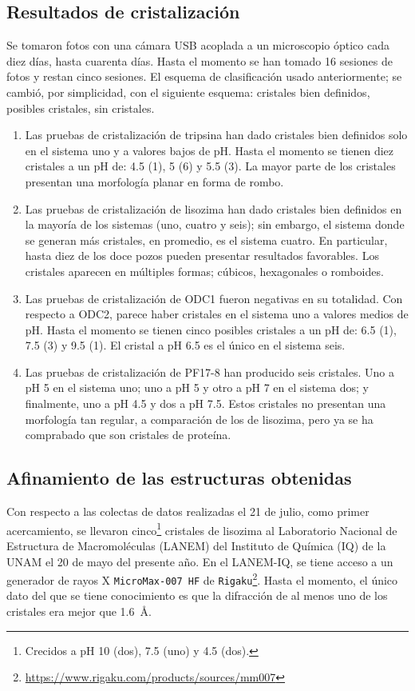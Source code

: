 \documentclass[11pt,letterpaper]{article}
\begin{document}
\subsection{Resultados de cristalización}
Se tomaron fotos con una cámara USB acoplada a un microscopio óptico cada diez días, hasta cuarenta días. Hasta el momento se han tomado 16 sesiones de fotos y restan cinco sesiones. El esquema de clasificación usado anteriormente; se cambió, por simplicidad, con el siguiente esquema: cristales bien definidos, posibles cristales, sin cristales.
\begin{enumerate}
	\item Las pruebas de cristalización de tripsina han dado cristales bien definidos solo en el sistema uno y a valores bajos de pH. Hasta el momento se tienen diez cristales a un pH de: 4.5 (1), 5 (6) y 5.5 (3). La mayor parte de los cristales presentan una morfología planar en forma de rombo.
	\item Las pruebas de cristalización de lisozima han dado cristales bien definidos en la mayoría de los sistemas (uno, cuatro y seis); sin embargo, el sistema donde se generan más cristales, en promedio, es el sistema cuatro. En particular, hasta diez de los doce pozos pueden presentar resultados favorables. Los cristales aparecen en múltiples formas; cúbicos, hexagonales o romboides.  
	\item Las pruebas de cristalización de ODC1 fueron negativas en su totalidad. Con respecto a ODC2, parece haber cristales en el sistema uno a valores medios de pH. Hasta el momento se tienen cinco posibles cristales a un pH de: \num{6.5} (\num{1}), \num{7.5} (\num{3}) y \num{9.5} (\num{1}). El cristal a pH 6.5 es el único en el sistema seis.
	\item Las pruebas de cristalización de PF17-8 han producido seis cristales. Uno a pH \num{5} en el sistema uno; uno a pH \num{5} y otro a pH \num{7} en el sistema dos; y finalmente, uno a pH \num{4.5} y dos a pH \num{7.5}. Estos cristales no presentan una morfología tan regular, a comparación de los de lisozima, pero ya se ha comprabado que son cristales de proteína.
\end{enumerate}

\subsection{Afinamiento de las estructuras obtenidas}
Con respecto a las colectas de datos realizadas el 21 de julio, como primer acercamiento, se llevaron cinco\footnote{Crecidos a pH 10 (dos), 7.5 (uno) y 4.5 (dos).} cristales de lisozima al Laboratorio Nacional de Estructura de Macromoléculas (LANEM) del Instituto de Química (IQ) de la UNAM el 20 de mayo del presente año. En el LANEM-IQ, se tiene acceso a un generador de rayos X \verb|MicroMax-007 HF| de \verb|Rigaku|\footnote{\url{https://www.rigaku.com/products/sources/mm007}}. Hasta el momento, el único dato del que se tiene conocimiento es que la difracción de al menos uno de los cristales era mejor que \SI{1.6}{\angstrom}. 
	 
\end{document}
